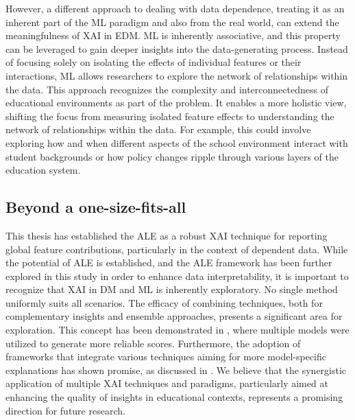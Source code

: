 However, a different approach to dealing with data dependence, treating it as an inherent part of the ML paradigm and also from the real world, can extend the meaningfulness of XAI in EDM. ML is inherently associative, and this property can be leveraged to gain deeper insights into the data-generating process. Instead of focusing solely on isolating the effects of individual features or their interactions, ML allows researchers to explore the network of relationships within the data. This approach recognizes the complexity and interconnectedness of educational environments as part of the problem. It enables a more holistic view, shifting the focus from measuring isolated feature effects to understanding the network of relationships within the data. For example, this could involve exploring how and when different aspects of the school environment interact with student backgrounds or how policy changes ripple through various layers of the education system.

\subsection{Beyond a one-size-fits-all }

This thesis has established the ALE as a robust XAI technique for reporting global feature contributions, particularly in the context of dependent data. While the potential of ALE is established, and the ALE framework has been further explored in this study in order to enhance data interpretability, it is important to recognize that XAI in DM and ML is inherently exploratory. No single method uniformly suits all scenarios. The efficacy of combining techniques, both for complementary insights and ensemble approaches, presents a significant area for exploration. This concept has been demonstrated in \cite{Fisher2018AllSimultaneously}, where multiple models were utilized to generate more reliable scores. Furthermore, the adoption of frameworks that integrate various techniques aiming for more model-specific explanations has shown promise, as discussed in \cite{Li2019AForests}. We believe that the synergistic application of multiple XAI techniques and paradigms, particularly aimed at enhancing the quality of insights in educational contexts, represents a promising direction for future research.




 




